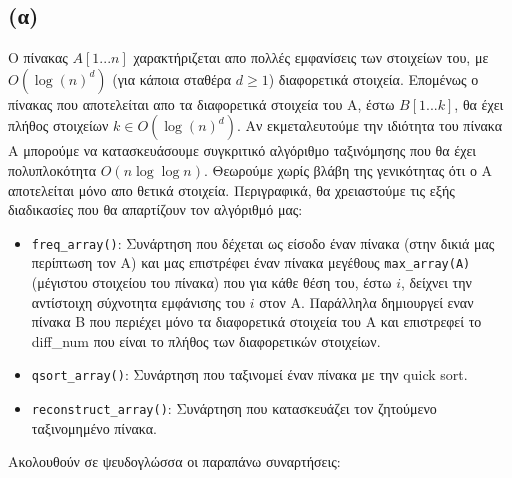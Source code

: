\documentclass[a4paper,12pt]{report}
\begin{document}
\subsection*{(α)}
Ο πίνακας $A[1...n]$ χαρακτήριζεται απο πολλές εμφανίσεις των στοιχείων του, με $O({\log(n)}^d)$ (για κάποια σταθέρα $d \geq 1$) διαφορετικά στοιχεία. Επομένως ο πίνακας που αποτελείται απο τα διαφορετικά στοιχεία του A, έστω $B[1...k]$, θα έχει πλήθος στοιχείων $k \in O({\log(n)}^d)$. Αν εκμεταλευτούμε την ιδιότητα του πίνακα Α μπορούμε να κατασκευάσουμε συγκριτικό αλγόριθμο ταξινόμησης που θα έχει πολυπλοκότητα $Ο(n\log \log n)$. Θεωρούμε χωρίς βλάβη της γενικότητας ότι ο Α αποτελείται μόνο απο θετικά στοιχεία.
Περιγραφικά, θα χρειαστούμε τις εξής διαδικασίες που θα απαρτίζουν τον αλγόριθμό μας:
\begin{itemize}
 \item \texttt{freq\_array()}: Συνάρτηση που δέχεται ως είσοδο έναν πίνακα (στην δικιά μας περίπτωση τον Α) και μας επιστρέφει έναν πίνακα μεγέθους
\texttt{max\_array(A)} (μέγιστου στοιχείου του πίνακα) που για κάθε θέση του, έστω $i$, δείχνει την αντίστοιχη σύχνοτητα εμφάνισης του $i$ στον Α. Παράλληλα δημιουργεί εναν πίνακα Β που περιέχει μόνο τα διαφορετικά στοιχεία του Α και επιστρεφεί το diff\_num που είναι το πλήθος των διαφορετικών στοιχείων. 
 \item \texttt{qsort\_array()}: Συνάρτηση που ταξινομεί έναν πίνακα με την quick sort.
 \item \texttt{reconstruct\_array()}: Συνάρτηση που κατασκευάζει τον ζητούμενο ταξινομημένο πίνακα.
\end{itemize}

Ακολουθούν σε ψευδογλώσσα οι παραπάνω συναρτήσεις:
\end{document}
